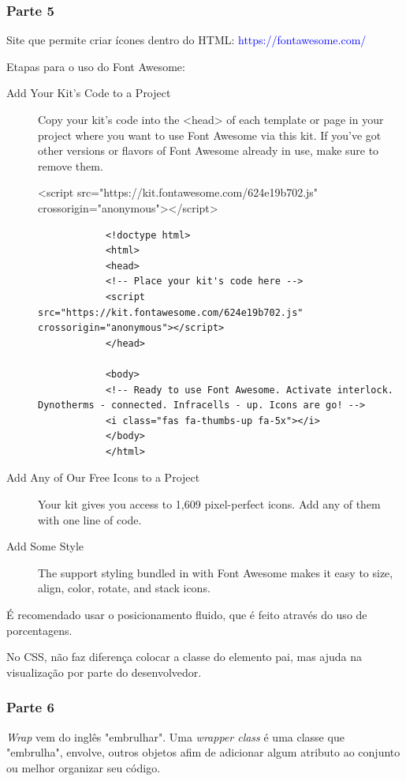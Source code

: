 \documentclass[12pt,a4paper]{article}
\begin{document}
	\subsubsection{Parte 5}
	
	Site que permite criar ícones dentro do HTML: \textcolor{blue}{https://fontawesome.com/}
	
	Etapas para o uso do Font Awesome:
	\begin{description}
		\item[Add Your Kit's Code to a Project]
		Copy your kit's code into the <head> of each template or page in your project where you want to use Font Awesome via this kit. If you've got other versions or flavors of Font Awesome already in use, make sure to remove them.
		
		<script src="https://kit.fontawesome.com/624e19b702.js" crossorigin="anonymous"></script>
		
		\begin{lstlisting}
			<!doctype html>
			<html>
			<head>
			<!-- Place your kit's code here -->
			<script src="https://kit.fontawesome.com/624e19b702.js" crossorigin="anonymous"></script>
			</head>
			
			<body>
			<!-- Ready to use Font Awesome. Activate interlock. Dynotherms - connected. Infracells - up. Icons are go! -->
			<i class="fas fa-thumbs-up fa-5x"></i>
			</body>
			</html>
		\end{lstlisting}
	
	\item[Add Any of Our Free Icons to a Project]
	Your kit gives you access to 1,609 pixel-perfect icons. Add any of them with one line of code.
	
	\item[Add Some Style]
	The support styling bundled in with Font Awesome makes it easy to size, align, color, rotate, and stack icons.
		
	\end{description}
	
	É recomendado usar o posicionamento fluido, que é feito através do uso de porcentagens.
	
	No CSS, não faz diferença colocar a classe do elemento pai, mas ajuda na visualização por parte do desenvolvedor.
	
	\subsubsection{Parte 6}
	
	\textit{Wrap} vem do inglês "embrulhar". Uma \textit{wrapper class} é uma classe que "embrulha", envolve, outros objetos afim de adicionar algum atributo ao conjunto ou melhor organizar seu código.
	
\end{document}
